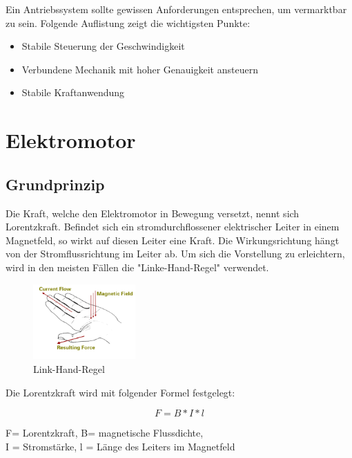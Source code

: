 \documentclass[12pt]{scrreprt} %
\begin{document}
Ein Antriebssystem sollte gewissen Anforderungen entsprechen, um vermarktbar zu sein. Folgende Auflistung zeigt die wichtigsten Punkte:

\begin{itemize}
\item{Stabile Steuerung der Geschwindigkeit}
\item{Verbundene Mechanik mit hoher Genauigkeit ansteuern}
\item{Stabile Kraftanwendung}
\end{itemize}

\newpage

\section{Elektromotor}
\label{sec:elektromotor}

\subsection{Grundprinzip}
\label{sec:grundprinzip}

Die Kraft, welche den Elektromotor in Bewegung versetzt, nennt sich Lorentzkraft.
Befindet sich ein stromdurchflossener elektrischer Leiter in einem Magnetfeld, so wirkt auf diesen Leiter eine Kraft.
Die Wirkungsrichtung hängt von der Stromflussrichtung im Leiter ab. 
Um sich die Vorstellung zu erleichtern, wird in den meisten Fällen die "Linke-Hand-Regel" verwendet.

\begin{figure}[!ht]
\begin{center}
	\caption{Link-Hand-Regel}
	\includegraphics[width=0.35\textwidth]{LinkehandRegel}
\end{center}
\end{figure}

Die Lorentzkraft wird mit folgender Formel festgelegt:

\begin{equation}
\label{eq:1}
 F = B * I * l
\end{equation}
\begin{center}
F= Lorentzkraft, B= magnetische Flussdichte, \\ I = Stromstärke, l = Länge des Leiters im Magnetfeld
\end{center}
\end{document}
